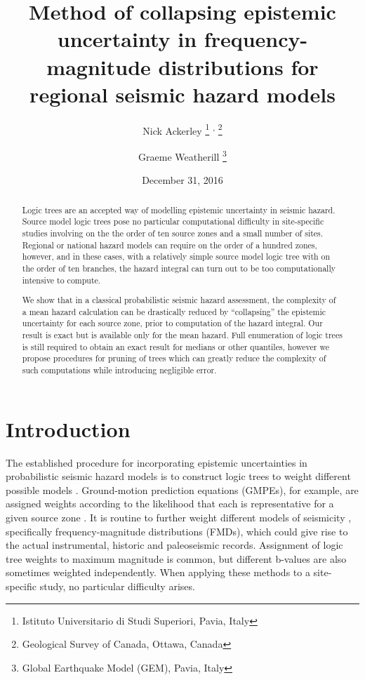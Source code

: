 \documentclass{article}
\begin{document}
\title{Method of collapsing epistemic uncertainty in frequency-magnitude distributions for regional seismic hazard models}
\date{December 31, 2016}

\author{
Nick Ackerley
\thanks{Istituto Universitario di Studi Superiori, Pavia, Italy} \textsuperscript{,}
\thanks{Geological Survey of Canada, Ottawa, Canada} \and 
Graeme Weatherill
\thanks{Global Earthquake Model (GEM), Pavia, Italy} }

\maketitle
\begin{abstract}
Logic trees are an accepted way of modelling epistemic uncertainty in seismic hazard. 
Source model logic trees pose no particular computational difficulty in site-specific studies involving on the the order of ten source zones and a small number of sites. 
Regional or national hazard models can require on the order of a hundred zones, however, and in these cases, with a relatively simple source model logic tree with on the order of ten branches, the hazard integral can turn out to be too computationally intensive to compute. 

We show that in a classical probabilistic seismic hazard assessment, the complexity of a mean hazard calculation can be drastically reduced by ``collapsing'' the epistemic uncertainty for each source zone, prior to computation of the hazard integral. 
Our result is exact but is available only for the mean hazard. 
Full enumeration of logic trees is still required to obtain an exact result for medians or other quantiles, however we propose procedures for pruning of trees which can greatly reduce the complexity of such computations while introducing negligible error. 
\end{abstract}

\section{Introduction}

The established procedure for incorporating epistemic uncertainties in probabilistic seismic hazard models is to construct logic trees to weight different possible models \citep{bommer2008use}. 
Ground-motion prediction equations (GMPEs), for example, are assigned weights according to the likelihood that each is representative for a given source zone \citep{delavaud2012toward, ceus2012central}. 
It is routine to further weight different models of seismicity \citep{ field2014uniform, woessner2015european}, specifically frequency-magnitude distributions (FMDs), which could give rise to the actual instrumental, historic and paleoseismic records. 
Assignment of logic tree weights to maximum magnitude is common, but different b-values are also sometimes weighted independently.
When applying these methods to a site-specific study, no particular difficulty arises.
\end{document}
